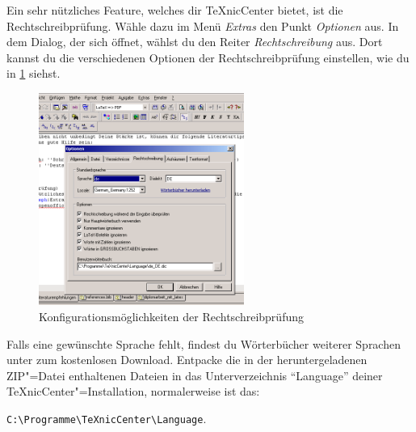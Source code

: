 Ein sehr nützliches Feature, welches dir TeXnicCenter bietet, ist die Rechtschreibprüfung. Wähle dazu im Menü \emph{Extras} den Punkt \emph{Optionen} aus. In dem Dialog, der sich öffnet, wählst du den Reiter \emph{Rechtschreibung} aus. Dort kannst du die verschiedenen Optionen der Rechtschreibprüfung einstellen, wie du in \cref{fig:rechtschreibung} siehst.

\begin{figure}
	\centering
		\includegraphics[width=0.60\textwidth]{images/rechtschreibung.png}
	\caption{Konfigurationsmöglichkeiten der Rechtschreibprüfung}
	\label{fig:rechtschreibung}
\end{figure}

Falls eine gewünschte Sprache fehlt, findest du Wörterbücher weiterer Sprachen unter
zum kostenlosen Download. Entpacke die in der heruntergeladenen ZIP"=Datei enthaltenen Dateien in das Unterverzeichnis \enquote{Language} deiner TeXnicCenter"=Installation, normalerweise ist das:

\verb|C:\Programme\TeXnicCenter\Language|.
